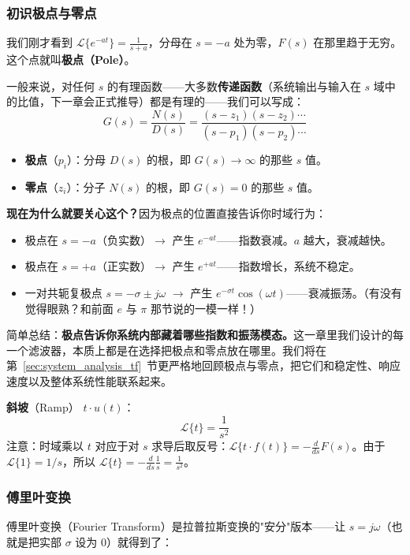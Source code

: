\subsubsection{初识极点与零点}

我们刚才看到 $\mathcal{L}\{e^{-at}\} = \frac{1}{s+a}$，分母在 $s = -a$ 处为零，$F(s)$ 在那里趋于无穷。这个点就叫\textbf{极点（Pole）}。

一般来说，对任何 $s$ 的有理函数——大多数\textbf{传递函数}（系统输出与输入在 $s$ 域中的比值，下一章会正式推导）都是有理的——我们可以写成：
\[
G(s) = \frac{N(s)}{D(s)} = \frac{(s - z_1)(s - z_2) \cdots}{(s - p_1)(s - p_2) \cdots}
\]
\begin{itemize}[nosep]
    \item \textbf{极点}（$p_i$）：分母 $D(s)$ 的根，即 $G(s) \to \infty$ 的那些 $s$ 值。
    \item \textbf{零点}（$z_i$）：分子 $N(s)$ 的根，即 $G(s) = 0$ 的那些 $s$ 值。
\end{itemize}

\textbf{现在为什么就要关心这个？}因为极点的位置直接告诉你时域行为：
\begin{itemize}[nosep]
    \item 极点在 $s = -a$（负实数）$\to$ 产生 $e^{-at}$——指数衰减。$a$ 越大，衰减越快。
    \item 极点在 $s = +a$（正实数）$\to$ 产生 $e^{+at}$——指数增长，系统不稳定。
    \item 一对共轭复极点 $s = -\sigma \pm j\omega$ $\to$ 产生 $e^{-\sigma t}\cos(\omega t)$——衰减振荡。（有没有觉得眼熟？和前面 $e$ 与 $\pi$ 那节说的一模一样！）
\end{itemize}

简单总结：\textbf{极点告诉你系统内部藏着哪些指数和振荡模态。}这一章里我们设计的每一个滤波器，本质上都是在选择把极点和零点放在哪里。我们将在第~\ref{sec:system_analysis_tf}~节更严格地回顾极点与零点，把它们和稳定性、响应速度以及整体系统性能联系起来。

\textbf{斜坡}（Ramp） $t \cdot u(t)$：
\[
\mathcal{L}\{t\} = \frac{1}{s^2}
\]
注意：时域乘以 $t$ 对应于对 $s$ 求导后取反号：$\mathcal{L}\{t \cdot f(t)\} = -\frac{d}{ds}F(s)$。由于 $\mathcal{L}\{1\} = 1/s$，所以 $\mathcal{L}\{t\} = -\frac{d}{ds}\frac{1}{s} = \frac{1}{s^2}$。

\subsubsection{傅里叶变换}

傅里叶变换（Fourier Transform）是拉普拉斯变换的"安分"版本——让 $s = j\omega$（也就是把实部 $\sigma$ 设为 0）就得到了：

